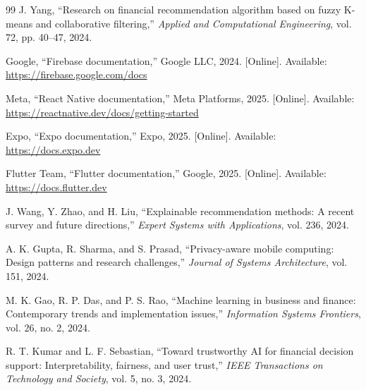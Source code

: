 \documentclass[12pt,a4paper]{report}
\begin{document}
\begin{thebibliography}{99}
J. Yang,
``Research on financial recommendation algorithm based on fuzzy K-means and collaborative filtering,''
\textit{Applied and Computational Engineering},
vol. 72,
pp. 40--47,
2024.

Google,
``Firebase documentation,''
Google LLC,
2024.
[Online].
Available:
\url{https://firebase.google.com/docs}

Meta,
``React Native documentation,''
Meta Platforms,
2025.
[Online].
Available:
\url{https://reactnative.dev/docs/getting-started}

Expo,
``Expo documentation,''
Expo,
2025.
[Online].
Available:
\url{https://docs.expo.dev}

Flutter Team,
``Flutter documentation,''
Google,
2025.
[Online].
Available:
\url{https://docs.flutter.dev}

J. Wang,
Y. Zhao,
and H. Liu,
``Explainable recommendation methods:
A recent survey and future directions,''
\textit{Expert Systems with Applications},
vol. 236,
2024.

A. K. Gupta,
R. Sharma,
and S. Prasad,
``Privacy-aware mobile computing:
Design patterns and research challenges,''
\textit{Journal of Systems Architecture},
vol. 151,
2024.

M. K. Gao,
R. P. Das,
and P. S. Rao,
``Machine learning in business and finance:
Contemporary trends and implementation issues,''
\textit{Information Systems Frontiers},
vol. 26,
no. 2,
2024.

R. T. Kumar and L. F. Sebastian,
``Toward trustworthy AI for financial decision support:
Interpretability,
fairness,
and user trust,''
\textit{IEEE Transactions on Technology and Society},
vol. 5,
no. 3,
2024.

\end{thebibliography}
\end{document}
